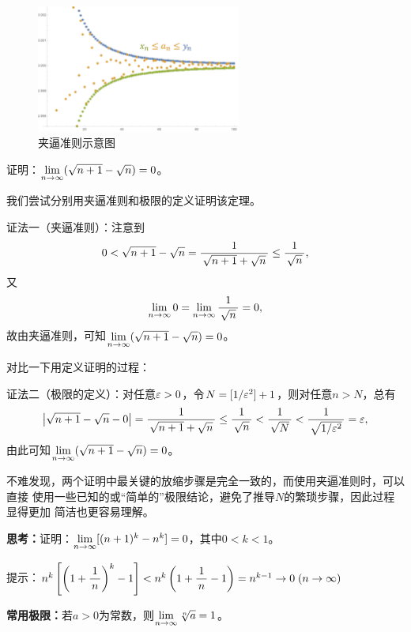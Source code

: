 \begin{figure}[h]
	\centering
	\includegraphics[width=0.6\textwidth]{./Images/Ch01/xnanyn.pdf}
	\caption{夹逼准则示意图}
	\label{fig:xnanyn}
\end{figure}

\bs

\egz 证明：$\lim\limits_{n\to\infty} (\sqrt{n+1}-\sqrt{n})=0$。

我们尝试分别用夹逼准则和极限的定义证明该定理。

证法一（夹逼准则）：注意到
$$0<\sqrt{n+1}-\sqrt{n}={\displaystyle\frac{\,{1}\,}{\,{\sqrt{n+1}+\sqrt{n}}\,}
\leq\displaystyle\frac{\,{1}\,}{\,{\sqrt{n}}\,}},$$
又
$$\lim\limits_{n\to\infty} 0=\lim\limits_{n\to\infty}\displaystyle\frac{\,{1}\,}{\,{\sqrt{n}}\,}=0,$$
故由夹逼准则，可知$\lim\limits_{n\to\infty} (\sqrt{n+1}-\sqrt{n})=0$。\fin

对比一下用定义证明的过程：

证法二（极限的定义）：对任意$\varepsilon>0$，令$N=[1/\varepsilon^2]+1$，则对任意$n>N$，总有
$$\left|\sqrt{n+1}-\sqrt{n}-0\right|
={\displaystyle\frac{\,{1}\,}{\,{\sqrt{n+1}+\sqrt{n}}\,}\leq\displaystyle\frac{\,{1}\,}{\,{\sqrt{n}}\,}}
<\displaystyle\frac{\,{1}\,}{\,{\sqrt{N}}\,}<\displaystyle\frac{\,{1}\,}{\,{\sqrt{1/\varepsilon^2}}\,}=\varepsilon,$$
由此可知$\lim\limits_{n\to\infty} (\sqrt{n+1}-\sqrt{n})=0$。\fin

不难发现，两个证明中最关键的放缩步骤是完全一致的，而使用夹逼准则时，可以直接
使用一些已知的或“简单的”极限结论，避免了推导$N$的繁琐步骤，因此过程显得更加
简洁也更容易理解。

\bs
{\bf 思考：}证明：$\lim\limits_{n\to\infty} [(n+1)^k-{n}^k]=0$，其中$0<k<1$。

\ifhint
提示：$n^k\left[\left(1+\displaystyle\frac{\,{1}\,}{\,{n}\,}\right)^k-1\right]
<n^k\left(1+\displaystyle\frac{\,{1}\,}{\,{n}\,}-1\right)=n^{k-1}\to 0\;(n\to\infty)$
\fi

\bs
{}
\begin{thx}
	{\bf 常用极限：}若$a>0$为常数，则$\lim\limits_{n\to\infty} \sqrt[n]{a}=1$。
\end{thx}

